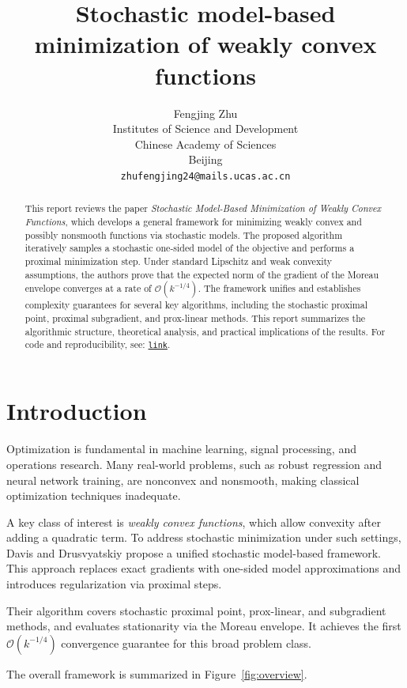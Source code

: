 \documentclass{article}
\title{Stochastic model-based minimization of weakly convex functions}
\author{
	Fengjing Zhu \\
	Institutes of Science and Development\\
	Chinese Academy of Sciences\\
	Beijing \\
	\texttt{zhufengjing24@mails.ucas.ac.cn} 
}
\begin{document}
\maketitle

\begin{abstract}
This report reviews the paper \textit{Stochastic Model-Based Minimization of Weakly Convex Functions}, which develops a general framework for minimizing weakly convex and possibly nonsmooth functions via stochastic models. The proposed algorithm iteratively samples a stochastic one-sided model of the objective and performs a proximal minimization step. Under standard Lipschitz and weak convexity assumptions, the authors prove that the expected norm of the gradient of the Moreau envelope converges at a rate of $\mathcal{O}(k^{-1/4})$. The framework unifies and establishes complexity guarantees for several key algorithms, including the stochastic proximal point, proximal subgradient, and prox-linear methods. This report summarizes the algorithmic structure, theoretical analysis, and practical implications of the results. For code and reproducibility, see: \href{https://github.com/ina2002/HW.git}{\texttt{link}}.
\end{abstract}


\section{Introduction}

Optimization is fundamental in machine learning, signal processing, and operations research. Many real-world problems, such as robust regression and neural network training, are nonconvex and nonsmooth, making classical optimization techniques inadequate.

A key class of interest is \emph{weakly convex functions}, which allow convexity after adding a quadratic term. To address stochastic minimization under such settings, Davis and Drusvyatskiy propose a unified stochastic model-based framework. This approach replaces exact gradients with one-sided model approximations and introduces regularization via proximal steps.

Their algorithm covers stochastic proximal point, prox-linear, and subgradient methods, and evaluates stationarity via the Moreau envelope. It achieves the first $\mathcal{O}(k^{-1/4})$ convergence guarantee for this broad problem class.

The overall framework is summarized in Figure~\ref{fig:overview}.
\end{document}
